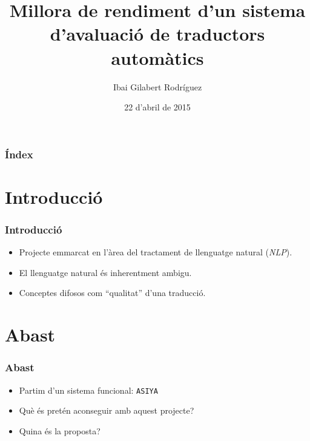 \documentclass{beamer}
\title[Short title]{Millora de rendiment d'un sistema d'avaluació de traductors automàtics} %
\author{Ibai Gilabert Rodríguez} %
\date{22 d'abril de 2015}
\begin{document}
\begin{frame}
\titlepage %
\end{frame}

\begin{frame}
\frametitle{Índex} %
\tableofcontents %
\end{frame}




\section{Introducció}
\begin{frame}
\frametitle{Introducció}
\begin{itemize}
\item Projecte emmarcat en l'àrea del tractament de llenguatge natural (\textit{NLP}). %

\item El llenguatge natural és inherentment ambigu.

\item Conceptes difosos com ``qualitat'' d'una traducció.
\end{itemize}
\end{frame}


\section{Abast}
\begin{frame}
\frametitle{Abast}
\begin{itemize}
\item Partim d'un sistema funcional: \texttt{ASIYA}

\item Què és pretén aconseguir amb aquest projecte?

\item Quina és la proposta?

\end{itemize}
\end{frame}
\end{document}
